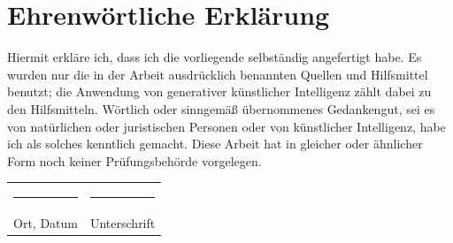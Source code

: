\clearpage
{}
{}

\section*{Ehrenwörtliche Erklärung}

Hiermit erkläre ich, dass ich die vorliegende \dokumententyp{} selbständig angefertigt habe.
Es wurden nur die in der Arbeit ausdrücklich benannten Quellen und Hilfsmittel benutzt;
die Anwendung von generativer künstlicher Intelligenz zählt dabei zu den Hilfsmitteln.
Wörtlich oder sinngemäß übernommenes Gedankengut, sei es von natürlichen oder juristischen
Personen oder von künstlicher Intelligenz, habe ich als solches kenntlich gemacht.
Diese Arbeit hat in gleicher oder ähnlicher Form noch keiner Prüfungsbehörde vorgelegen.

\vspace{2.5cm}

\noindent
\begin{tabularx}{\textwidth}{X X}
  \rule{6cm}{0.4pt} & \rule{6cm}{0.4pt} \\[0.3em]
  Ort, Datum        & Unterschrift \\
\end{tabularx}
